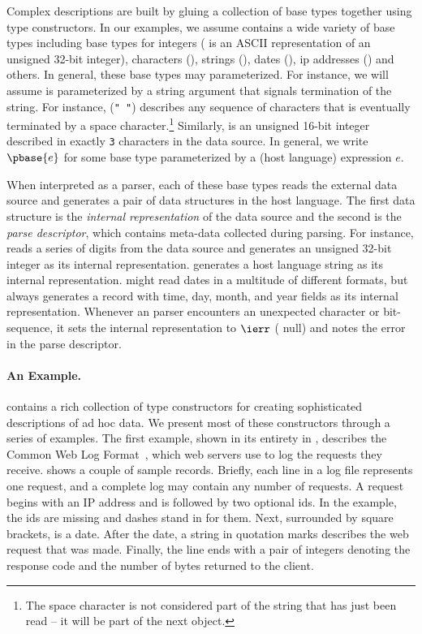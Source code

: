 Complex \ipads{} descriptions are built by gluing a collection of base types
together using \ipads{} type constructors.  In our examples,
we assume \ipads{} contains a wide variety of base types
including base types for 
integers (\Puint{} is an ASCII representation of an 
unsigned 32-bit integer), 
characters (\Pchar), strings (\Pstring), dates (\Pdate), ip addresses
(\Pip) and others.
In general, these base types may parameterized.  For instance,
we will assume \Pstring{} is parameterized by a string argument
that signals termination of the string.  For instance,
\Pstring({\tt " "}) describes any sequence of characters that is eventually
terminated by a space character.\footnote{The space character
is not considered part of the string that has just been 
read -- it will be part of the
next object.}  Similarly,  is an 
unsigned 16-bit integer described in exactly {\tt 3} characters
in the data source.  In general, we write $\pbase{e}$ for some
base type parameterized by a (host language) expression $e$. 

When interpreted as a parser, each of these base types reads
the external data source and generates a pair of data structures
in the host language.  The first data structure is the
{\em internal representation} of the data source and
the second is the {\em parse descriptor}, which contains meta-data collected during parsing.
For instance, \Puint{} reads a series of digits from the
data source and generates an unsigned 32-bit integer as its
internal representation.  \Pstring{} generates a 
host language string as its internal representation.  
\Pdate{} might read dates in a multitude of
different formats, but always generates a record
with time, day, month, and year fields as its internal 
representation.  Whenever an \ipads{} parser encounters
an unexpected character or bit-sequence, it sets the internal representation to
$\ierr$ (\ie{} null) and notes the error in the
parse descriptor.

\paragraph*{An \ipads{} Example.}
\ipads{} contains a rich collection of type constructors
for creating sophisticated descriptions of ad hoc data.
We present most of these constructors 
through a series of examples.
The first example, shown in its entirety in
, describes the
Common Web Log Format~\cite{wpp}, which 
web servers use to log the requests they receive.  
 shows a couple of sample records.
Briefly, each line in a log file represents one request, and
a complete log may contain any number of requests.
A request begins with an IP address
and is followed by two optional ids.  In the example, the ids are
missing and dashes stand in for them.  Next, surrounded by square brackets,
is a date.  After the date, a string in quotation marks describes the
web request that was made.  Finally, the line ends with a pair of integers denoting the response code and the number of bytes returned to the client.


